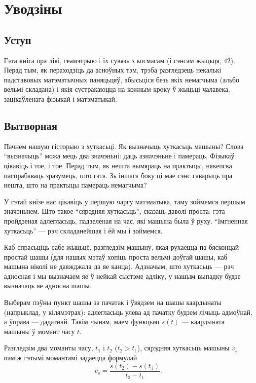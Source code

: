 \documentclass[10pt,a4paper]{book}
\theoremstyle{plain}
\begin{document}
\chapter{Уводзіны}

\section{Уступ}

Гэта кніга пра лікі, геамэтрыю і іх сувязь з космасам (і сэнсам жыцьця,
42). Перад тым, як пераходзіць да асноўных тэм, трэба разгледзець некалькі
падставовых матэматычных паняцьцяў, абысьціся безь якіх немагчыма (альбо вельмі
складана) і якія сустракаюцца на кожным кроку ў жыцьці чалавека, зацікаўленага
фізыкай і матэматыкай.

\section{Вытворная}

Пачнем нашую гісторыю з хуткасьці. Як вызначыць хуткасьць машыны? Слова
``вызначыць'' можа мець два значэньні: даць азначэньне і памераць. Фізыкаў
цікавіць і тое, і тое. Перад тым, як нешта вымяраць на практыцы, някепска
паспрабаваць зразумець, што гэта. Зь іншага боку ці мае сэнс гаварыць пра нешта,
што на практыцы памераць немагчыма?

У гэтай кнізе нас цікавіць у першую чаргу матэматыка, таму зоймемся першым
значэньнем. Што такое ``сярэдняя хуткасьць'', сказаць даволі проста: гэта
пройдзеная адлегласьць, падзеленая на час, які машына была ў руху. ``Імгненная
хуткасьць'' --- рэч складанейшая і ёй мы і зоймемся.

Каб спрасьціць сабе жыцьцё, разгледзім машыну, якая рухаецца па бясконцай
простай шашы (для нашых мэтаў хопіць проста вельмі доўгай шашы, каб машына
ніколі не даяжджала да яе канца). Адзначым, што хуткасьць --- рэч адносная і мы
вызначаем яе ў нейкай сыстэме адліку, у нашым выпадку будзе вызначаць яе адносна
шашы.

Выберам пэўны пункт шашы за пачатак і ўвядзем на шашы каардынаты (напрыклад, у
кілямэтрах): адлегласьць улева ад пачатку будзем лічыць адмоўнай, а ўправа ---
дадатнай. Такім чынам, маем функцыю $s(t)$ --- каардыната машыны ў момант часу
$t$.

Разгледзім два моманты часу, $t_1$ і $t_2$ ($t_2 > t_1$), сярэдняя хуткасьць
машыны $v_{s}$ паміж гэтымі момантамі задаецца формулай
\begin{equation*}
  v_{s} = \frac{s(t_2) - s(t_1)}{t_2 - t_1}.
\end{equation*}
\end{document}
